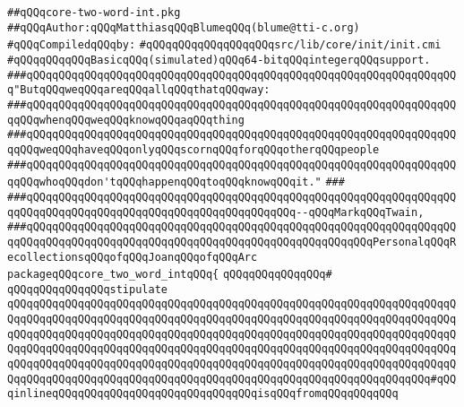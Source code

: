 \label{src/lib/core/init/core-two-word-int.pkg}
\verb|##qQQqcore-two-word-int.pkg|\newline
\verb|##qQQqAuthor:qQQqMatthiasqQQqBlumeqQQq(blume@tti-c.org)|\newline
\newline
\verb|#qQQqCompiledqQQqby:|\newline
\verb|#qQQqqQQqqQQqqQQqqQQqsrc/lib/core/init/init.cmi|\newline
\newline
\verb|#qQQqqQQqqQQqBasicqQQq(simulated)qQQq64-bitqQQqintegerqQQqsupport.|\newline
\newline
\newline
\newline
\newline
\verb|###qQQqqQQqqQQqqQQqqQQqqQQqqQQqqQQqqQQqqQQqqQQqqQQqqQQqqQQqqQQqqQQqqQQq"ButqQQqweqQQqareqQQqallqQQqthatqQQqway:|\newline
\verb|###qQQqqQQqqQQqqQQqqQQqqQQqqQQqqQQqqQQqqQQqqQQqqQQqqQQqqQQqqQQqqQQqqQQqqQQqwhenqQQqweqQQqknowqQQqaqQQqthing|\newline
\verb|###qQQqqQQqqQQqqQQqqQQqqQQqqQQqqQQqqQQqqQQqqQQqqQQqqQQqqQQqqQQqqQQqqQQqqQQqweqQQqhaveqQQqonlyqQQqscornqQQqforqQQqotherqQQqpeople|\newline
\verb|###qQQqqQQqqQQqqQQqqQQqqQQqqQQqqQQqqQQqqQQqqQQqqQQqqQQqqQQqqQQqqQQqqQQqqQQqwhoqQQqdon'tqQQqhappenqQQqtoqQQqknowqQQqit."|\newline
\verb|###|\newline
\verb|###qQQqqQQqqQQqqQQqqQQqqQQqqQQqqQQqqQQqqQQqqQQqqQQqqQQqqQQqqQQqqQQqqQQqqQQqqQQqqQQqqQQqqQQqqQQqqQQqqQQqqQQqqQQqqQQq--qQQqMarkqQQqTwain,|\newline
\verb|###qQQqqQQqqQQqqQQqqQQqqQQqqQQqqQQqqQQqqQQqqQQqqQQqqQQqqQQqqQQqqQQqqQQqqQQqqQQqqQQqqQQqqQQqqQQqqQQqqQQqqQQqqQQqqQQqqQQqqQQqqQQqPersonalqQQqRecollectionsqQQqofqQQqJoanqQQqofqQQqArc|\newline
\newline
\newline
\newline
\verb|packageqQQqcore_two_word_intqQQq{|\newline
\verb|qQQqqQQqqQQqqQQq#|\newline
\verb|qQQqqQQqqQQqqQQqstipulate|\newline
\verb|qQQqqQQqqQQqqQQqqQQqqQQqqQQqqQQqqQQqqQQqqQQqqQQqqQQqqQQqqQQqqQQqqQQqqQQqqQQqqQQqqQQqqQQqqQQqqQQqqQQqqQQqqQQqqQQqqQQqqQQqqQQqqQQqqQQqqQQqqQQqqQQqqQQqqQQqqQQqqQQqqQQqqQQqqQQqqQQqqQQqqQQqqQQqqQQqqQQqqQQqqQQqqQQqqQQqqQQqqQQqqQQqqQQqqQQqqQQqqQQqqQQqqQQqqQQqqQQqqQQqqQQqqQQqqQQqqQQqqQQqqQQqqQQqqQQqqQQqqQQqqQQqqQQqqQQqqQQqqQQqqQQqqQQqqQQqqQQqqQQqqQQqqQQqqQQqqQQqqQQqqQQqqQQqqQQqqQQqqQQqqQQqqQQqqQQqqQQqqQQqqQQqqQQqqQQqqQQq#qQQqinlineqQQqqQQqqQQqqQQqqQQqqQQqqQQqqQQqisqQQqfromqQQqqQQqqQQq|\newline
